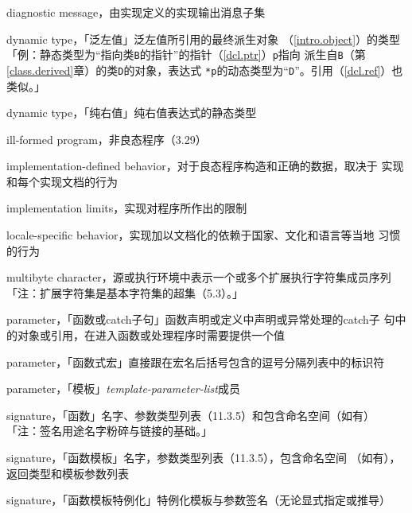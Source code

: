 \noindent diagnostic message，由实现定义的实现输出消息子集

\noindent dynamic type，「泛左值」泛左值所引用的最终派生对象
（\ref{intro.object}）的类型 \\
「例：静态类型为``指向类\texttt{B}的指针''的指针（\ref{dcl.ptr}）\texttt{p}指向
派生自\texttt{B}（第\ref{class.derived}章）的类\texttt{D}的对象，表达式
\texttt{*p}的动态类型为``\texttt{D}''。引用（\ref{dcl.ref}）也类似。」

\noindent dynamic type，「纯右值」纯右值表达式的静态类型

\noindent ill-formed program，非良态程序（3.29）

\noindent implementation-defined behavior，对于良态程序构造和正确的数据，取决于
实现和每个实现文档的行为

\noindent implementation limits，实现对程序所作出的限制

\noindent locale-specific behavior，实现加以文档化的依赖于国家、文化和语言等当地
习惯的行为

\noindent multibyte character，源或执行环境中表示一个或多个扩展执行字符集成员序列
「注：扩展字符集是基本字符集的超集（5.3）。」

\noindent parameter，「函数或catch子句」函数声明或定义中声明或异常处理的catch子
句中的对象或引用，在进入函数或处理程序时需要提供一个值

\noindent parameter，「函数式宏」直接跟在宏名后括号包含的逗号分隔列表中的标识符

\noindent parameter，「模板」\textit{template-parameter-list}成员

\noindent signature，「函数」名字、参数类型列表（11.3.5）和包含命名空间（如有）\\
「注：签名用途名字粉碎与链接的基础。」

\noindent signature，「函数模板」名字，参数类型列表（11.3.5），包含命名空间
（如有），返回类型和模板参数列表

\noindent signature，「函数模板特例化」特例化模板与参数签名（无论显式指定或推导）

